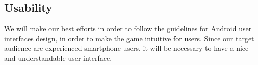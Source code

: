 \subsection{Usability} 
We will make our best efforts in order to follow the guidelines for Android
user interfaces design, in order to make the game intuitive for users. Since our
target audience are experienced smartphone users, it will be necessary to have
a nice and understandable user interface.

